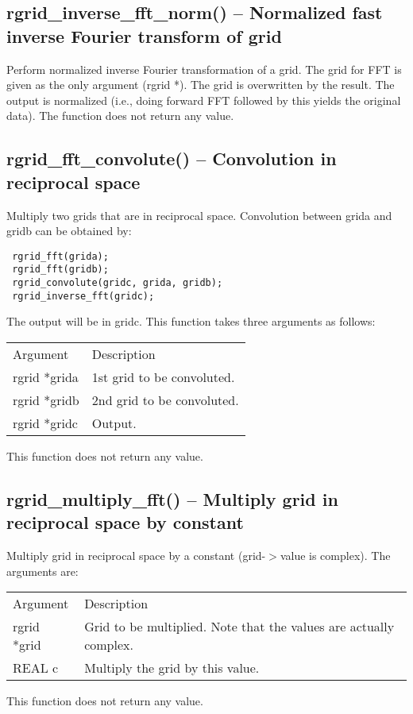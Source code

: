 \documentclass[12pt,letterpaper]{report}
\begin{document}
\subsection{rgrid\_inverse\_fft\_norm() -- Normalized fast inverse Fourier transform of grid}

Perform normalized inverse Fourier transformation of a grid. The grid for FFT is given as the only argument (rgrid *). The grid is overwritten by the result. The output is normalized (i.e., doing forward FFT followed by this yields the original data). The function does not return any value.

\subsection{rgrid\_fft\_convolute() -- Convolution in reciprocal space}

Multiply two grids that are in reciprocal space. Convolution between grida and gridb can be obtained by:
\begin{verbatim}
 rgrid_fft(grida);
 rgrid_fft(gridb);
 rgrid_convolute(gridc, grida, gridb);
 rgrid_inverse_fft(gridc);
\end{verbatim}
The output will be in gridc. This function takes three arguments as follows:
\begin{longtable}{p{} p{}}
Argument & Description\\
\cline{1-2}
rgrid *grida & 1st grid to be convoluted.\\ 
rgrid *gridb & 2nd grid to be convoluted.\\
rgrid *gridc & Output.\\
\end{longtable}
\noindent
This function does not return any value.

\subsection{rgrid\_multiply\_fft() -- Multiply grid in reciprocal space by constant}

Multiply grid in reciprocal space by a constant (grid-$>$value is complex). The arguments are:
\begin{longtable}{p{} p{}}
Argument & Description\\
\cline{1-2}
rgrid *grid & Grid to be multiplied. Note that the values are actually complex.\\
REAL c & Multiply the grid by this value.\\
\end{longtable}
\noindent
This function does not return any value.
\end{document}
